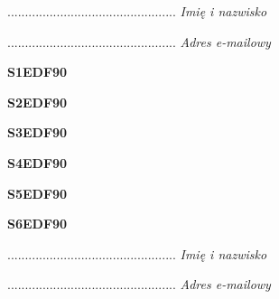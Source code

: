 \begin{turn}{90}\begin{minipage}{\linewidth} \vspace{20mm} ................................................  \textit{Imię i nazwisko}\end{minipage}\end{turn}

\begin{turn}{90}\begin{minipage}{\linewidth} \vspace{20mm} ................................................  \textit{Adres e-mailowy}\end{minipage}\end{turn}

\begin{turn}{90}\huge \textbf{S1EDF90}\end{turn}

\begin{turn}{90}\huge \textbf{S2EDF90}\end{turn}

\begin{turn}{90}\huge \textbf{S3EDF90}\end{turn}

\begin{turn}{90}\huge \textbf{S4EDF90}\end{turn}

\begin{turn}{90}\huge \textbf{S5EDF90}\end{turn}

\begin{turn}{90}\huge \textbf{S6EDF90}\end{turn}

\begin{turn}{90}\begin{minipage}{\linewidth} \vspace{20mm} ................................................  \textit{Imię i nazwisko}\end{minipage}\end{turn}

\begin{turn}{90}\begin{minipage}{\linewidth} \vspace{20mm} ................................................  \textit{Adres e-mailowy}\end{minipage}\end{turn}

